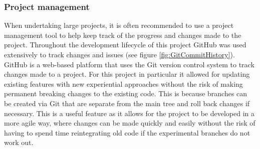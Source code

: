 \subsubsection{Project management}


When undertaking large projects, it is often recommended to use a project management tool to help keep track of the progress and changes made to the project. Throughout the development lifecycle of this project GitHub was used extensively to track changes and issues (see figure \ref{fig:GitCommitHistory}). GitHub is a web-based platform that uses the Git version control system to track changes made to a project. For this project in particular it allowed for updating existing features with new experiential approaches without the risk of making permanent breaking changes to the existing code. This is because branches can be created via Git that are separate from the main tree and roll back changes if necessary. This is a useful feature as it allows for the project to be developed in a more agile way, where changes can be made quickly and easily without the risk of having to spend time reintegrating old code if the experimental branches do not work out.

